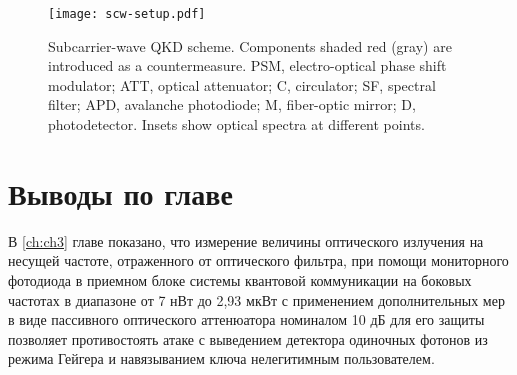 \begin{figure}
	\centering \texttt{[image: scw-setup.pdf]}
	\caption{Subcarrier-wave QKD scheme. Components shaded red (gray) are introduced as a countermeasure. PSM, electro-optical phase shift modulator; ATT, optical attenuator; C, circulator; SF, spectral filter; APD,  avalanche photodiode;  M, fiber-optic mirror; D, photodetector. Insets show optical spectra at different points.}
	\label{fig:scw-setup}
\end{figure}

\pagebreak
\section{Выводы по главе} \label{ch:ch3/sec8}


В \ref{ch:ch3} главе показано, что измерение величины оптического излучения на несущей частоте, отраженного от оптического фильтра, при помощи мониторного фотодиода в приемном блоке системы квантовой коммуникации на боковых частотах в диапазоне от 7 нВт до 2,93 мкВт с применением дополнительных мер в виде пассивного оптического аттенюатора номиналом 10 дБ для его защиты позволяет противостоять атаке с выведением детектора одиночных фотонов из режима Гейгера и навязыванием ключа нелегитимным пользователем. 
  